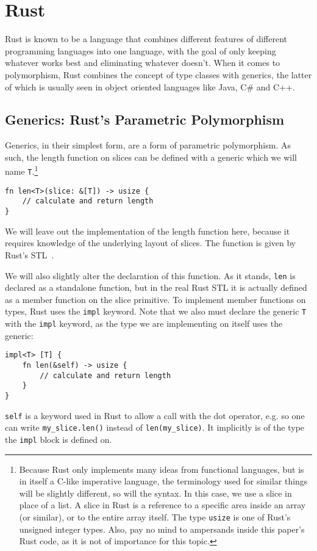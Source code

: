 \section{Rust}

Rust is known to be a language that combines different features of different programming languages into one language, with the goal of only keeping whatever works best and eliminating whatever doesn't.
When it comes to polymorphism, Rust combines the concept of type classes with generics, the latter of which is usually seen in object oriented languages like Java, C\# and C++.

\subsection{Generics: Rust's Parametric Polymorphism}

Generics, in their simplest form, are a form of parametric polymorphism. As such, the length function on slices can be defined with a generic which we will name \verb|T|.\footnote{Because Rust only implements many ideas from functional languages, but is in itself a C-like imperative language, the terminology used for similar things will be slightly different, so will the syntax. In this case, we use a slice in place of a list. A slice in Rust is a reference to a specific area inside an array (or similar), or to the entire array itself. The type \verb|usize| is one of Rust's unsigned integer types. Also, pay no mind to ampersands inside this paper's Rust code, as it is not of importance for this topic.}
\begin{verbatim}
fn len<T>(slice: &[T]) -> usize {
    // calculate and return length
}
\end{verbatim}
We will leave out the implementation of the length function here, because it requires knowledge of the underlying layout of slices. The function is given by Rust's STL~\cite{rust-len}.

We will also slightly alter the declaration of this function. As it stands, \verb|len| is declared as a standalone function, but in the real Rust STL it is actually defined as a member function on the slice primitive. To implement member functions on types, Rust uses the \verb|impl| keyword. Note that we also must declare the generic \verb|T| with the \verb|impl| keyword, as the type we are implementing on itself uses the generic:
\begin{verbatim}
impl<T> [T] {
    fn len(&self) -> usize {
        // calculate and return length
    }
}
\end{verbatim}
\verb|self| is a keyword used in Rust to allow a call with the dot operator, e.g. so one can write \verb|my_slice.len()| instead of \verb|len(my_slice)|. It implicitly is of the type the \verb|impl| block is defined on.

